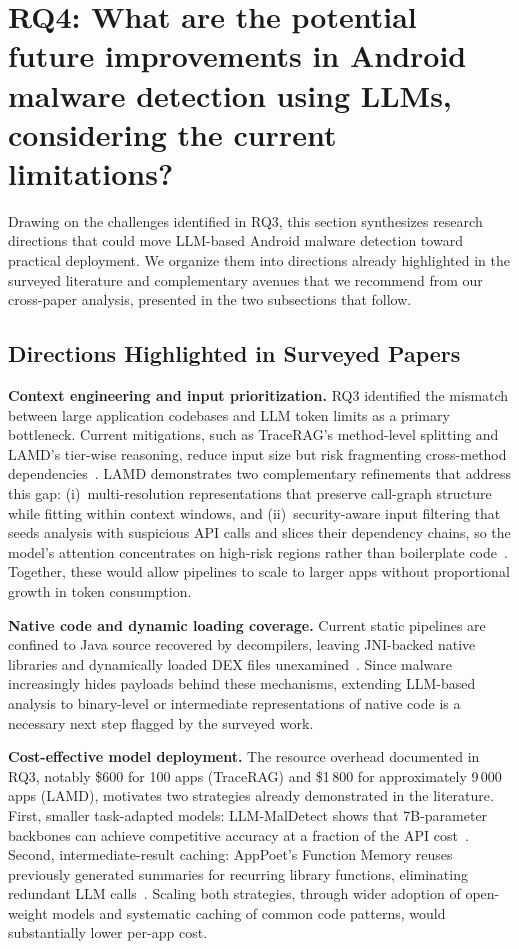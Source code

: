 \section{RQ4: What are the potential future improvements in Android malware detection using LLMs, considering the current limitations?}\label{sec:rq4}

Drawing on the challenges identified in RQ3, this section synthesizes research directions that could move LLM-based Android malware detection toward practical deployment. We organize them into directions already highlighted in the surveyed literature and complementary avenues that we recommend from our cross-paper analysis, presented in the two subsections that follow.

\subsection{Directions Highlighted in Surveyed Papers}
\leavevmode\par
\textbf{Context engineering and input prioritization.}
RQ3 identified the mismatch between large application codebases and LLM token limits as a primary bottleneck. Current mitigations, such as TraceRAG's method-level splitting and LAMD's tier-wise reasoning, reduce input size but risk fragmenting cross-method dependencies~\cite{Zhang2025-ot,Qian2025-ua}. LAMD demonstrates two complementary refinements that address this gap: (i)~multi-resolution representations that preserve call-graph structure while fitting within context windows, and (ii)~security-aware input filtering that seeds analysis with suspicious API calls and slices their dependency chains, so the model's attention concentrates on high-risk regions rather than boilerplate code~\cite{Qian2025-ua}. Together, these would allow pipelines to scale to larger apps without proportional growth in token consumption.

\textbf{Native code and dynamic loading coverage.}
Current static pipelines are confined to Java source recovered by decompilers, leaving JNI-backed native libraries and dynamically loaded DEX files unexamined~\cite{Zhang2025-ot}. Since malware increasingly hides payloads behind these mechanisms, extending LLM-based analysis to binary-level or intermediate representations of native code is a necessary next step flagged by the surveyed work.

\textbf{Cost-effective model deployment.}
The resource overhead documented in RQ3, notably \$600 for 100 apps (TraceRAG) and \$1\,800 for approximately 9\,000 apps (LAMD), motivates two strategies already demonstrated in the literature. First, smaller task-adapted models: LLM-MalDetect shows that 7B-parameter backbones can achieve competitive accuracy at a fraction of the API cost~\cite{Feng2025-ry}. Second, intermediate-result caching: AppPoet's Function Memory reuses previously generated summaries for recurring library functions, eliminating redundant LLM calls~\cite{Zhao2024-dw}. Scaling both strategies, through wider adoption of open-weight models and systematic caching of common code patterns, would substantially lower per-app cost.

